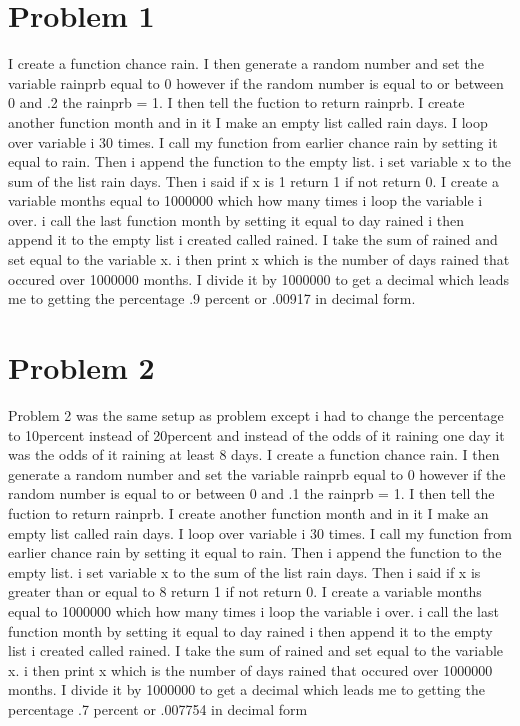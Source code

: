 \documentclass[twocolumn]{revtex4}
\begin{document}
\section{Problem 1}
I create a function chance rain. I then generate a random number and set the variable rainprb equal to 0 however if the random number is equal to or between 0 and .2 the rainprb = 1.  I then tell the fuction to return rainprb.  
I create another function month and in it I make an empty list called rain days.  I loop over variable i 30 times.  I call my function from earlier chance rain by setting it equal to rain.  Then i append the function to the empty list.  i set variable x to the sum of the list rain days.  Then i said if x is 1 return 1 if not return 0.
I create a variable months equal to 1000000 which how many times i loop the variable i over. i call the last function month by setting it equal to day rained i then append it to the empty list i created called rained.  I take the sum of rained and set equal to the variable x.
i then print x which is the number of days rained that occured over 1000000 months.  I divide it by 1000000 to get a decimal which leads me to getting the percentage .9 percent or .00917 in decimal form.
\section{Problem 2}

Problem 2 was the same setup as problem except i had to change the percentage to 10percent  instead of 20percent and instead of the odds of it raining  one day it was the odds of it raining at least 8 days.
I create a function chance rain. I then generate a random number and set the variable rainprb equal to 0 however if the random number is equal to or between 0 and .1 the rainprb = 1.  I then tell the fuction to return rainprb.  
I create another function month and in it I make an empty list called rain days.  I loop over variable i 30 times.  I call my function from earlier chance rain by setting it equal to rain.  Then i append the function to the empty list.  i set variable x to the sum of the list rain days.  Then i said if x is greater than or equal to 8 return 1 if not return 0.
I create a variable months equal to 1000000 which how many times i loop the variable i over. i call the last function month by setting it equal to day rained i then append it to the empty list i created called rained.  I take the sum of rained and set equal to the variable x.
i then print x which is the number of days rained that occured over 1000000 months.  I divide it by 1000000 to get a decimal which leads me to getting the percentage .7 percent or .007754  in decimal form
\end{document}
